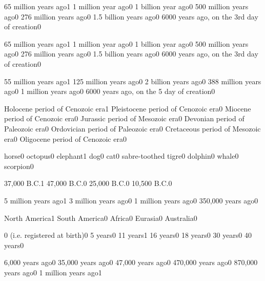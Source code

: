 {65 million years ago}{1}
{1 million year ago}{0}
{1 billion year ago}{0}
{500 million years ago}{0}
{276 million years ago}{0}
{1.5 billion years ago}{0}
{6000 years ago, on the 3rd day of creation}{0}
\qstop

{65 million years ago}{1}
{1 million year ago}{0}
{1 billion year ago}{0}
{500 million years ago}{0}
{276 million years ago}{0}
{1.5 billion years ago}{0}
{6000 years ago, on the 3rd day of creation}{0}
\qstop

{55 million years ago}{1}
{125 million years ago}{0}
{2 billion years ago}{0}
{388 million years ago}{0}
{1 million years ago}{0}
{6000 years ago, on the 5 day of creation}{0}
\qstop


{Holocene period of Cenozoic era}{1}
{Pleistocene period of Cenozoic era}{0}
{Miocene period of Cenozoic era}{0}
{Jurassic period of Mesozoic era}{0}
{Devonian period of Paleozoic era}{0}
{Ordovician period of Paleozoic era}{0}
{Cretaceous period of Mesozoic era}{0}
{Oligocene period of Cenozoic era}{0}
\qstop

{horse}{0}
{octopus}{0}
{elephant}{1}
{dog}{0}
{cat}{0}
{sabre-toothed tigre}{0}
{dolphin}{0}
{whale}{0}
{scorpion}{0}
\qstop

{37,000 B.C.}{1}
{47,000 B.C.}{0}
{25,000 B.C.}{0}
{10,500 B.C.}{0}
\qstop

{5 million years ago}{1}
{3 million years ago}{0}
{1 million years ago}{0}
{350,000 years ago}{0}
\qstop

{North America}{1}
{South America}{0}
{Africa}{0}
{Eurasia}{0}
{Australia}{0}
\qstop

{0 (i.e. registered at birth)}{0}
{5 years}{0}
{11 years}{1}
{16 years}{0}
{18 years}{0}
{30 years}{0}
{40 years}{0}
\qstop


{6,000 years ago}{0}
{35,000 years ago}{0}
{47,000 years ago}{0}
{470,000 years ago}{0}
{870,000 years ago}{0}
{1 million years ago}{1}
\qstop

